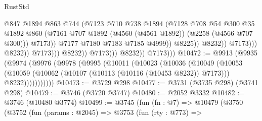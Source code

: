 \begin{lexlean}{RustStd}
\begin{coremodule}
                                                    @847
                                                    @1894
                                                    @863
                                                    @744
                                                    (@7123
                                                      @710
                                                      @738
                                                      @1894
                                                      (@7128
                                                        @708
                                                        @54
                                                        @300
                                                        @35
                                                        @1892
                                                        @860
                                                        (@7161
                                                          @707
                                                          @1892
                                                          (@4560 (@4561 @1892))
                                                          (@2258 (@4566 @707 @300)))
                                                        @7173))
                                                    @7177
                                                    @7180
                                                    @7183
                                                    @7185
                                                    @4999))
                                                @8225))
                                            @8232))
                                        @7173)))
                                  @8232))
                              @7173)))
                        @8232))
                    @7173)))
              @8232))
          @7173)))
@10472 := @9913
    (@9935
      (@9974
        (@9976
          (@9978
            (@9995
              (@10011
                (@10023
                  (@10036
                    (@10049
                      (@10053
                        (@10059
                          (@10062 (@10107 (@10113 (@10116 (@10453 @8232)) @7173)))
                          @8232)))))))))))
@10473 := @3729 @298
@10477 := @3731 (@3735 @298) (@3741 @298)
@10479 := @3746 (@3720 @3747)
@10480 := @2052 @3332
@10482 := @3746 (@10480 @3774)
@10499 := @3745
    (fun (fn : @7) =>
    @10479
      (@3750
        (@3752
          (fun (params : @2045) =>
          @3753
            (fun (rty : @773) =>

\end{coremodule}
\end{lexlean}

